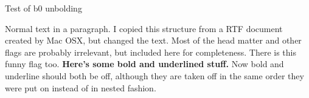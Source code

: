 \documentclass[11pt]{article}
\title{}
\begin{document}
\maketitle

\normalsize{Test of b0 unbolding\par
}%
{\large Normal text in a paragraph. I copied this structure from a RTF document created by Mac OSX, but changed the text. Most of the head matter and other flags are probably irrelevant, but included here for completeness. There is \:this funny flag too. {\bf Here's some bold and underlined stuff.
}
 Now bold and underline should both be off, although they are taken off in the same order they were put on instead of in nested fashion.\par
}
\end{document}

